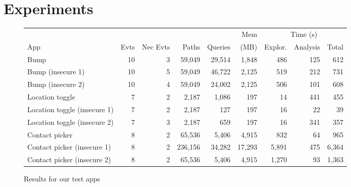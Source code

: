 \documentclass[10pt,conference,compsocconf]{IEEEtran}
\newcommand{\comment}[3][\color{red}]{{#1{[{#2}: {#3}]}}}
\newcommand{\kris}[1]{\comment[\color{orange}]{kris}{#1}}
\begin{document}

\section{Experiments}
\label{sec:experiments}

\begin{figure*}
\small
\centering
\begin{tabular}{ | l | r | r || r | r | r | r | r | r |}
  \hline
  &&&&& Mem &\multicolumn{3}{c|}{Time (s)} \\ \cline{6-8}
  App & Evts & Nec Evts & Paths & Queries &
  (MB) & Explor. & Analysis & Total \\
  \hline
  Bump & 10 & 3 & 59,049 & 29,514 & 1,848 & 486 & 125 & 612 \\
  Bump (insecure 1) & 10 & 5 & 59,049 & 46,722 & 2,125 & 519 & 212 & 731 \\
  Bump (insecure 2) & 10 & 4 & 59,049 & 24,002 & 2,125 & 506 & 101 & 608 \\
  Location toggle & 7 & 2 & 2,187 & 1,086 & 197 & 14 & 441 & 455 \\
  Location toggle (insecure 1) & 7 & 2  & 2,187 & 127 & 197 & 16 & 22 & 39 \\
  Location toggle (insecure 2) & 7 & 3 & 2,187 & 659 & 197 & 16 & 341 & 357 \\
  Contact picker & 8 & 2 & 65,536 & 5,406 & 4,915 & 832 & 64 & 965 \\
  Contact picker (insecure 1) & 8 & 2 & 236,156 & 34,282 & 17,293 & 5,891 & 475 & 6,364  \\
  Contact picker (insecure 2) & 8 & 2 & 65,536 & 5,406 & 4,915 & 1,270 & 93 & 1,363 \\
  \hline
\end{tabular}
\caption{Results for our test apps}
\label{fig:results}
\end{figure*}
\end{document}
